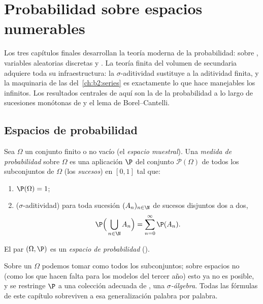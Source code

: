 \chapter{Probabilidad sobre espacios numerables}\label{ch:b2:proba}

Los tres capítulos finales desarrollan la teoría moderna de la
probabilidad:  sobre 
, variables aleatorias discretas y
. La teoría finita del volumen de secundaria
adquiere toda su infraestructura: la $\sigma$-aditividad sustituye a
la aditividad finita, y la maquinaria de las  del~\cref{ch:b2:series} es exactamente lo que hace manejables los
 infinitos. Los resultados centrales de aquí son la
 de la probabilidad a lo largo de sucesiones monótonas de
 y el lema de Borel--Cantelli.

\section{Espacios de probabilidad}

\begin{definition}\label{def:b2:proba:space}
Sea $\Omega$ un conjunto finito o  no vacío (el
\emph{espacio muestral}). Una \emph{medida de
probabilidad} sobre $\Omega$ es una
aplicación $\P$ del conjunto $\mathcal{P}(\Omega)$ de todos los
subconjuntos de $\Omega$ (los \emph{sucesos}) en $[0,
1]$ tal que:
\begin{enumerate}
\item $\P(\Omega) = 1$;
\item ($\sigma$-aditividad) para toda sucesión $(A_n)_{n\in\N}$ de
sucesos disjuntos dos a dos,
\[
\P\Bigl(\,\bigcup_{n \in \N} A_n\Bigr)
= \sum_{n=0}^{\infty} \P(A_n) .
\]
\end{enumerate}
El par $(\Omega, \P)$ es un \emph{espacio de
probabilidad} ().
\end{definition}

\begin{remark}
Sobre un $\Omega$  podemos tomar como  todos los
subconjuntos; sobre espacios no  (como los que hacen falta
para los modelos  del tercer año) esto ya no es posible, y se
restringe $\P$ a una colección adecuada de , una
\emph{$\sigma$-álgebra}. Todas las fórmulas de este capítulo
sobreviven a esa generalización palabra por palabra.
\end{remark}

